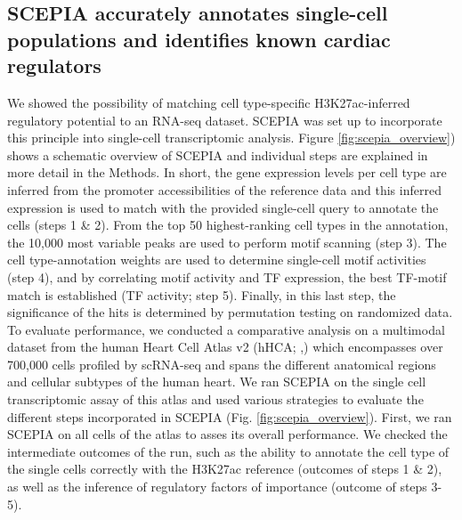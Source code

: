 \subsection{SCEPIA accurately annotates single-cell populations and identifies known cardiac regulators}

We showed the possibility of matching cell type-specific H3K27ac-inferred regulatory potential to an RNA-seq dataset. SCEPIA was set up to incorporate this principle into single-cell transcriptomic analysis. Figure \ref{fig:scepia_overview}) shows a schematic overview of SCEPIA and individual steps are explained in more detail in the Methods. In short, the gene expression levels per cell type are inferred from the promoter accessibilities of the reference data and this inferred expression is used to match with the provided single-cell query to annotate the cells (steps 1 \& 2). From the top 50 highest-ranking cell types in the annotation, the 10,000 most variable peaks are used to perform motif scanning (step 3). The cell type-annotation weights are used to determine single-cell motif activities (step 4), and by correlating motif activity and TF expression, the best TF-motif match is established (TF activity; step 5). Finally, in this last step, the significance of the hits is determined by permutation testing on randomized data. To evaluate performance, we conducted a comparative analysis on a multimodal dataset from the human Heart Cell Atlas v2 (hHCA; \cite{Kanemaru2023},) which encompasses over 700,000 cells profiled by scRNA-seq and spans the different anatomical regions and cellular subtypes of the human heart. We ran SCEPIA on the single cell transcriptomic assay of this atlas and used various strategies to evaluate the different steps incorporated in SCEPIA (Fig. \ref{fig:scepia_overview}). First, we ran SCEPIA on all cells of the atlas to asses its overall performance. We checked the intermediate outcomes of the run, such as the ability to annotate the cell type of the single cells correctly with the H3K27ac reference (outcomes of steps 1 \& 2), as well as the inference of regulatory factors of importance (outcome of steps 3-5). 


